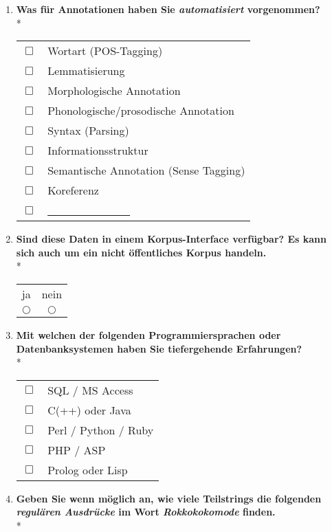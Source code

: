\begin{enumerate}
	\item{
		\textbf{Was für Annotationen haben Sie \emph{automatisiert} vorgenommen?}\\*

			\begin{tabular}{c l}
				$\Box$ & Wortart (POS-Tagging) \\
				$\Box$ & Lemmatisierung \\
				$\Box$ & Morphologische Annotation \\
				$\Box$ & Phonologische/prosodische Annotation \\
				$\Box$ & Syntax (Parsing) \\
				$\Box$ & Informationsstruktur \\
				$\Box$ & Semantische Annotation (Sense Tagging) \\
				$\Box$ & Koreferenz \\
				$\Box$ & \underline{\ \ \ \ \ \ \ \ \ \ \ \ \ \ \ }
			\end{tabular}
	}
	
	\item{
		\textbf{Sind diese Daten in einem Korpus-Interface verfügbar? Es kann sich auch um ein nicht öffentliches Korpus handeln.}\\*
		\begin{center}
			\begin{tabular}{c | c}
				ja & nein\\
				$\bigcirc$ & $\bigcirc$
			\end{tabular}
		\end{center}
	}
	
	\item{
		\textbf{Mit welchen der folgenden Programmiersprachen oder Datenbanksystemen haben Sie tiefergehende Erfahrungen?}\\*

			\begin{tabular}{c l}
				$\Box$ & SQL / MS Access \\
				$\Box$ & C(++) oder Java \\
				$\Box$ & Perl / Python / Ruby \\
				$\Box$ & PHP / ASP \\
				$\Box$ & Prolog oder Lisp
			\end{tabular}
	}
	
	\item{
		\textbf{Geben Sie wenn möglich an, wie viele Teilstrings die folgenden \emph{regulären Ausdrücke} im Wort \emph{Rokkokokomode} finden.}\\*

}
\end{enumerate}
